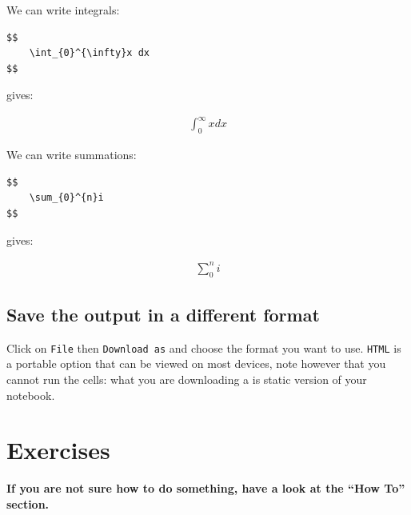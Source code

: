 We can write integrals:

\begin{verbatim}
$$
    \int_{0}^{\infty}x dx
$$
\end{verbatim}


gives:

\begin{equation*}
\begin{split}
    \int_{0}^{\infty}x dx
\end{split}
\end{equation*}

We can write summations:

\begin{verbatim}
$$
    \sum_{0}^{n}i
$$
\end{verbatim}


gives:

\begin{equation*}
\begin{split}
    \sum_{0}^{n}i
\end{split}
\end{equation*}

\subsection{Save the output in a different format}

Click on \texttt{File} then \texttt{Download as} and choose the format you want
to use. \texttt{HTML}
is a portable option that can be viewed on most devices, note however that you
cannot run the cells: what you are downloading a is static version of your
notebook.

\section{Exercises}

\textbf{If you are not sure how to do something, have a look at the “How To” section.}

